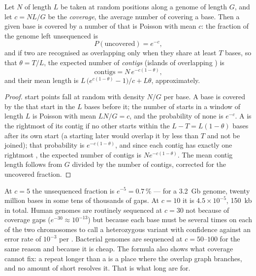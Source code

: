 \begin{theorem}\label{thm:b3:genomics:lander-waterman}
Let $N$  of length $L$ be taken at random positions along a
genome of length $G$, and let $c = NL/G$ be the \emph{coverage}, the
average number of  covering a base. Then a given base is covered
by a number of  that is Poisson with mean $c$: the fraction of
the genome left unsequenced is
\[
P(\text{uncovered}) = e^{-c},
\]
and if two  are recognised as overlapping only when they share at
least $T$ bases, so that $\theta = T/L$, the expected number of
\emph{contigs} (islands of overlapping ) is
\[
\text{contigs} = N\,e^{-c(1-\theta)},
\]
and their mean length is $L\,\bigl(e^{c(1-\theta)} - 1\bigr)/c + L\theta$,
approximately.
\end{theorem}
\begin{proof}
 start points fall at random with density $N/G$ per base. A base
is covered by the  that start in the $L$ bases before it; the
number of starts in a window of length $L$ is Poisson with mean $LN/G
= c$, and the probability of none is $e^{-c}$. A  is the rightmost
of its contig if no other  starts within the $L - T = L(1-\theta)$
bases after its own start (a  starting later would overlap it by
less than $T$ and not be joined); that probability is $e^{-c(1-\theta)}$,
and since each contig has exactly one rightmost , the expected
number of contigs is $N e^{-c(1-\theta)}$. The mean contig length
follows from $G$ divided by the number of contigs, corrected for the
uncovered fraction.
\end{proof}

\begin{example}\label{ex:b3:genomics:coverage}
At $c = 5$ the unsequenced fraction is $e^{-5} = 0.7\,\%$ --- for a
\qty{3.2}{Gb} genome, twenty million bases in some tens of thousands of
gaps. At $c = 10$ it is $4.5\times 10^{-5}$, \qty{150}{kb} in total.
Human genomes are routinely sequenced at $c = 30$ not because of
coverage gaps ($e^{-30} \approx 10^{-13}$) but because each base must
be  several times on each of the two chromosomes to call a
heterozygous variant with confidence against an error rate of $10^{-3}$
per . Bacterial genomes are sequenced at $c = 50$--$100$ for the
same reason and because it is cheap. The formula also shows what
coverage cannot fix: a repeat longer than a  is a place where the
overlap graph branches, and no amount of short  resolves it. That
is what long  are for.
\end{example}

